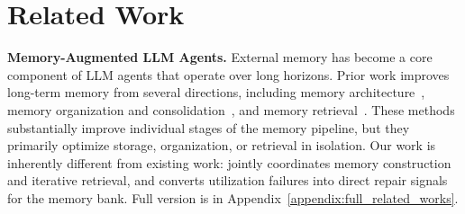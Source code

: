 \section{Related Work}
\noindent\textbf{Memory-Augmented LLM Agents.}
External memory has become a core component of LLM agents that operate over long horizons.
Prior work improves long-term memory from several directions, including memory architecture~\cite{packer2023memgpt,zhong2024memorybank}, memory organization and consolidation~\cite{xu2025mem,fang2025lightmem}, and memory retrieval~\cite{du2025memr}.
These methods substantially improve individual stages of the memory pipeline, but they primarily optimize storage, organization, or retrieval in isolation.
Our work is inherently different from existing work: \method jointly coordinates memory construction and iterative retrieval, and converts utilization failures into direct repair signals for the memory bank.
Full version is in Appendix~\ref{appendix:full_related_works}.

